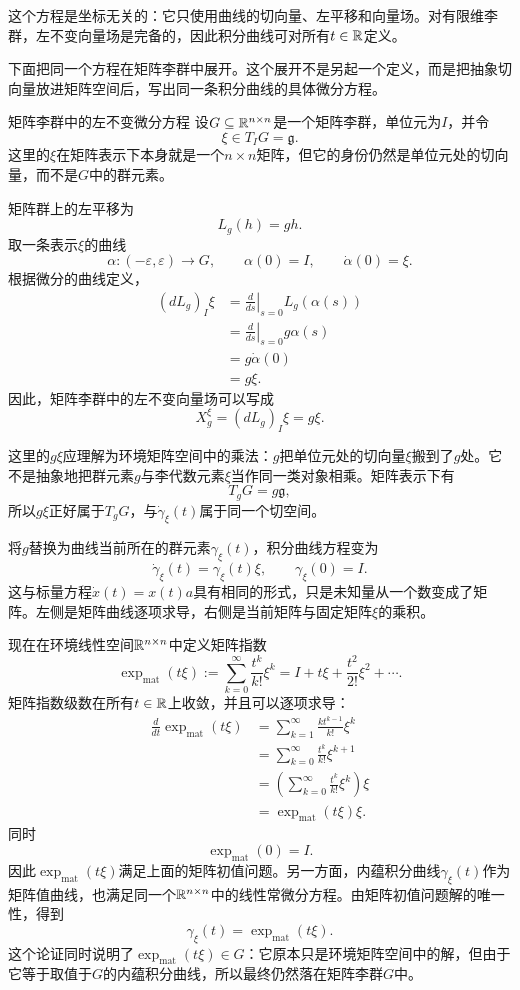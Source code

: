 这个方程是坐标无关的：它只使用曲线的切向量、左平移和向量场。对有限维李群，左不变向量场是完备的，因此积分曲线可对所有$t\in\mathbb{R}$定义。

下面把同一个方程在矩阵李群中展开。这个展开不是另起一个定义，而是把抽象切向量放进矩阵空间后，写出同一条积分曲线的具体微分方程。

\begin{lieexample}{矩阵李群中的左不变微分方程}
设$G\subseteq\mathbb{R}^{n\times n}$是一个矩阵李群，单位元为$I$，并令
\[
    \xi\in T_IG=\mathfrak g.
\]
这里的$\xi$在矩阵表示下本身就是一个$n\times n$矩阵，但它的身份仍然是单位元处的切向量，而不是$G$中的群元素。

矩阵群上的左平移为
\[
    L_g(h)=gh.
\]
取一条表示$\xi$的曲线
\[
    \alpha:(-\varepsilon,\varepsilon)\to G,
    \qquad
    \alpha(0)=I,
    \qquad
    \dot\alpha(0)=\xi.
\]
根据微分的曲线定义，
\[
\begin{aligned}
    (dL_g)_I\xi
    &=\left.\frac{d}{ds}\right|_{s=0}L_g(\alpha(s))\\
    &=\left.\frac{d}{ds}\right|_{s=0}g\alpha(s)\\
    &=g\dot\alpha(0)\\
    &=g\xi.
\end{aligned}
\]
因此，矩阵李群中的左不变向量场可以写成
\[
    \boxed{X^\xi_g=(dL_g)_I\xi=g\xi.}
\]

这里的$g\xi$应理解为环境矩阵空间中的乘法：$g$把单位元处的切向量$\xi$搬到了$g$处。它不是抽象地把群元素$g$与李代数元素$\xi$当作同一类对象相乘。矩阵表示下有
\[
    T_gG=g\mathfrak g,
\]
所以$g\xi$正好属于$T_gG$，与$\dot\gamma_\xi(t)$属于同一个切空间。

将$g$替换为曲线当前所在的群元素$\gamma_\xi(t)$，积分曲线方程变为
\[
    \boxed{
    \dot\gamma_\xi(t)=\gamma_\xi(t)\xi,
    \qquad
    \gamma_\xi(0)=I.
    }
\]
这与标量方程$\dot x(t)=x(t)a$具有相同的形式，只是未知量从一个数变成了矩阵。左侧是矩阵曲线逐项求导，右侧是当前矩阵与固定矩阵$\xi$的乘积。
\end{lieexample}

现在在环境线性空间$\mathbb{R}^{n\times n}$中定义矩阵指数
\[
    \exp_{\mathrm{mat}}(t\xi)
    :=\sum_{k=0}^{\infty}\frac{t^k}{k!}\xi^k
    =I+t\xi+\frac{t^2}{2!}\xi^2+\cdots.
\]
矩阵指数级数在所有$t\in\mathbb{R}$上收敛，并且可以逐项求导：
\[
\begin{aligned}
    \frac{d}{dt}\exp_{\mathrm{mat}}(t\xi)
    &=\sum_{k=1}^{\infty}\frac{k t^{k-1}}{k!}\xi^k\\
    &=\sum_{k=0}^{\infty}\frac{t^k}{k!}\xi^{k+1}\\
    &=\left(\sum_{k=0}^{\infty}\frac{t^k}{k!}\xi^k\right)\xi\\
    &=\exp_{\mathrm{mat}}(t\xi)\xi.
\end{aligned}
\]
同时
\[
    \exp_{\mathrm{mat}}(0)=I.
\]
因此$\exp_{\mathrm{mat}}(t\xi)$满足上面的矩阵初值问题。另一方面，内蕴积分曲线$\gamma_\xi(t)$作为矩阵值曲线，也满足同一个$\mathbb{R}^{n\times n}$中的线性常微分方程。由矩阵初值问题解的唯一性，得到
\[
    \boxed{
    \gamma_\xi(t)=\exp_{\mathrm{mat}}(t\xi).
    }
\]
这个论证同时说明了$\exp_{\mathrm{mat}}(t\xi)\in G$：它原本只是环境矩阵空间中的解，但由于它等于取值于$G$的内蕴积分曲线，所以最终仍然落在矩阵李群$G$中。

